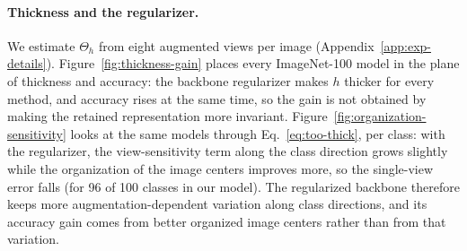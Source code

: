 \paragraph{Thickness and the regularizer.}
We estimate $\Theta_h$ from eight augmented views per image (Appendix~\ref{app:exp-details}). Figure~\ref{fig:thickness-gain} places every ImageNet-100 model in the plane of thickness and accuracy: the backbone regularizer makes $h$ thicker for every method, and accuracy rises at the same time, so the gain is not obtained by making the retained representation more invariant. Figure~\ref{fig:organization-sensitivity} looks at the same models through Eq.~\eqref{eq:too-thick}, per class: with the regularizer, the view-sensitivity term along the class direction grows slightly while the organization of the image centers improves more, so the single-view error falls (for 96 of 100 classes in our model). The regularized backbone therefore keeps more augmentation-dependent variation along class directions, and its accuracy gain comes from better organized image centers rather than from that variation.

